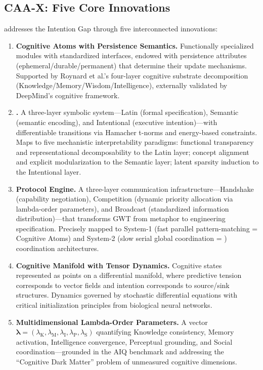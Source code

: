 \documentclass[11pt,a4paper]{article}
\theoremstyle{definition}
\theoremstyle{remark}
\newcommand{\CAA}{\text{CAA-X}}
\newcommand{\CML}{\text{CML 2.0}}
\newcommand{\GWP}{\text{GWP}}
\newcommand{\lambdaK}{\lambda_{\text{K}}}
\newcommand{\lambdaM}{\lambda_{\text{M}}}
\newcommand{\lambdaI}{\lambda_{\text{I}}}
\newcommand{\lambdaP}{\lambda_{\text{P}}}
\newcommand{\lambdaS}{\lambda_{\text{S}}}
\newcommand{\lambdavec}{\boldsymbol{\lambda}}
\begin{document}
\subsection{CAA-X: Five Core Innovations}\label{subsec:five-innovations}

\CAA{} addresses the Intention Gap through five interconnected innovations:

\begin{enumerate}
    \item \textbf{Cognitive Atoms with Persistence Semantics.} Functionally specialized modules with standardized interfaces, endowed with persistence attributes (ephemeral/durable/permanent) that determine their update mechanisms. Supported by Roynard et al.'s four-layer cognitive substrate decomposition (Knowledge/Memory/Wisdom/Intelligence), externally validated by DeepMind's cognitive framework.

    \item \textbf{\CML{}.} A three-layer symbolic system---Latin (formal specification), Semantic (semantic encoding), and Intentional (executive intention)---with differentiable transitions via Hamacher t-norms and energy-based constraints. Maps to five mechanistic interpretability paradigms: functional transparency and representational decomposability to the Latin layer; concept alignment and explicit modularization to the Semantic layer; latent sparsity induction to the Intentional layer.

    \item \textbf{\GWP{} Protocol Engine.} A three-layer communication infrastructure---Handshake (capability negotiation), Competition (dynamic priority allocation via lambda-order parameters), and Broadcast (standardized information distribution)---that transforms GWT from metaphor to engineering specification. Precisely mapped to System-1 (fast parallel pattern-matching = Cognitive Atoms) and System-2 (slow serial global coordination = \GWP{}) coordination architectures.

    \item \textbf{Cognitive Manifold with Tensor Dynamics.} Cognitive states represented as points on a differential manifold, where predictive tension corresponds to vector fields and intention corresponds to source/sink structures. Dynamics governed by stochastic differential equations with critical initialization principles from biological neural networks.

    \item \textbf{Multidimensional Lambda-Order Parameters.} A vector $\lambdavec = (\lambdaK, \lambdaM, \lambdaI, \lambdaP, \lambdaS)$ quantifying Knowledge consistency, Memory activation, Intelligence convergence, Perceptual grounding, and Social coordination---grounded in the AIQ benchmark and addressing the ``Cognitive Dark Matter'' problem of unmeasured cognitive dimensions.
\end{enumerate}
\end{document}
